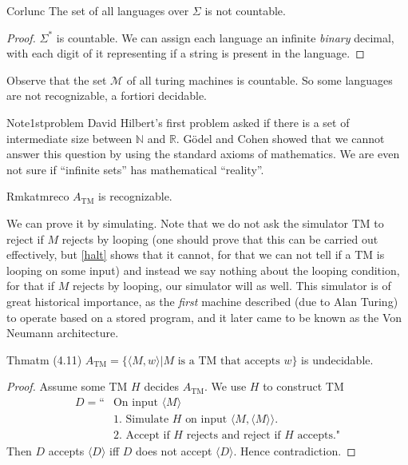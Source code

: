 \begin{reference}{Cor}{lunc}
  The set of all languages over $\Sigma$ is not countable.
\end{reference}

\begin{proof}
  $\Sigma^*$ is countable. We can assign each language an infinite \textit{binary} decimal, with each digit of it representing if a string is present in the language.
\end{proof}

Observe that the set $\mathcal{M}$ of all turing machines is countable. So some languages are not recognizable, a fortiori decidable.

\begin{reference}{Note}{1stproblem}
  David Hilbert's first problem asked if there is a set of intermediate size between $\mathbb{N}$ and $\mathbb{R}$. Gödel and Cohen showed that we cannot answer this question by using the standard axioms of mathematics. We are even not sure if ``infinite sets'' has mathematical ``reality''.
\end{reference}

\begin{reference}{Rmk}{atmreco}
  $A_{\mathrm{TM}}$ is recognizable.
\end{reference}

We can prove it by simulating. Note that we do not ask the simulator TM to reject if $M$ rejects by looping (one should prove that this can be carried out effectively, but \ref{halt} shows that it cannot, for that we can not tell if a TM is looping on some input) and instead we say nothing about the looping condition, for that if $M$ rejects by looping, our simulator will as well. This simulator is of great historical importance, as the \textit{first} machine described (due to Alan Turing) to operate based on a stored program, and it later came to be known as the Von Neumann architecture.

\begin{reference}{Thm}{atm}
  (4.11) $A_{\mathrm{TM}}=\{\langle M,w\rangle|M\text{ is a TM that accepts }w\}$ is undecidable.
\end{reference}

\begin{proof}
  Assume some TM $H$ decides $A_{\mathrm{TM}}$. We use $H$ to construct TM
  \begin{align*}
    D=\text{``} & \text{On input }\langle M\rangle                                        \\
                & \text{1. Simulate }H\text{ on input }\langle M,\langle M\rangle\rangle. \\
                & \text{2. Accept if }H\text{ rejects and reject if }H\text{ accepts."}
  \end{align*}
  Then $D$ accepts $\langle D\rangle$ iff $D$ does not accept $\langle D\rangle$. Hence contradiction.
\end{proof}

